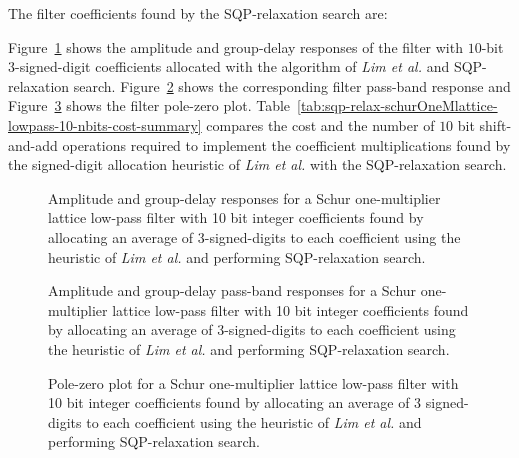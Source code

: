 \documentclass[a4paper,twoside,10pt,english]{report}
\begin{document}
The filter coefficients found by the SQP-relaxation search are:
\begin{small}


\end{small}

Figure~\ref{fig:sqp-relax-schurOneMlattice-lowpass-10-nbits-response}
shows the amplitude and group-delay responses of the filter with $10$-bit 
$3$-signed-digit coefficients allocated with the algorithm of \emph{Lim et al.}
and SQP-relaxation search.
Figure~\ref{fig:sqp-relax-schurOneMlattice-lowpass-10-nbits-pass-response}
shows the corresponding filter pass-band response and
Figure~\ref{fig:sqp-relax-schurOneMlattice-lowpass-10-nbits-pz}
shows the filter pole-zero plot.
Table~\ref{tab:sqp-relax-schurOneMlattice-lowpass-10-nbits-cost-summary} 
compares the cost and the number of $10$ bit shift-and-add operations required 
to implement the coefficient multiplications found by the signed-digit 
allocation heuristic of \emph{Lim et al.} with the SQP-relaxation search.
\begin{figure}[!htbp]
\begin{center}
\scalebox{0.7}{}
\caption{Amplitude and group-delay responses for a Schur
  one-multiplier lattice low-pass filter with 10 bit integer coefficients found
  by allocating an average of 3-signed-digits to each coefficient using the
  heuristic of \emph{Lim et al.} and performing SQP-relaxation search.}
\label{fig:sqp-relax-schurOneMlattice-lowpass-10-nbits-response}
\end{center}
\end{figure}
\begin{figure}[!htbp]
\begin{center}
\scalebox{0.7}{}
\caption{Amplitude and group-delay pass-band responses for a Schur
  one-multiplier lattice low-pass filter with 10 bit integer coefficients found
  by allocating an average of 3-signed-digits to each coefficient using the
  heuristic of \emph{Lim et al.} and performing SQP-relaxation search.}
\label{fig:sqp-relax-schurOneMlattice-lowpass-10-nbits-pass-response}
\end{center}
\end{figure}
\begin{figure}[!htbp]
\begin{center}
\scalebox{0.7}{}
\caption{Pole-zero plot for a Schur
  one-multiplier lattice low-pass filter with 10 bit integer coefficients found
  by allocating an average of 3 signed-digits to each coefficient using the
  heuristic of \emph{Lim et al.} and performing SQP-relaxation search.}
\label{fig:sqp-relax-schurOneMlattice-lowpass-10-nbits-pz}
\end{center}
\end{figure}
\end{document}
